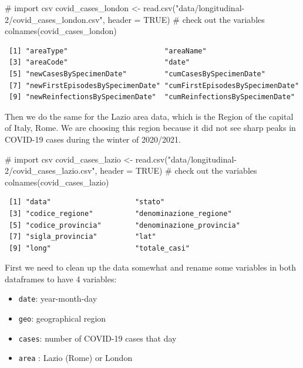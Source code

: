 \documentclass[
  letterpaper,
  DIV=11,
  numbers=noendperiod]{scrreprt}
\newenvironment{Shaded}{\begin{snugshade}}{\end{snugshade}}
\newcommand{\AttributeTok}[1]{\textcolor[rgb]{0.40,0.45,0.13}{#1}}
\newcommand{\CommentTok}[1]{\textcolor[rgb]{0.37,0.37,0.37}{#1}}
\newcommand{\ConstantTok}[1]{\textcolor[rgb]{0.56,0.35,0.01}{#1}}
\newcommand{\FunctionTok}[1]{\textcolor[rgb]{0.28,0.35,0.67}{#1}}
\newcommand{\NormalTok}[1]{\textcolor[rgb]{0.00,0.23,0.31}{#1}}
\newcommand{\OtherTok}[1]{\textcolor[rgb]{0.00,0.23,0.31}{#1}}
\newcommand{\StringTok}[1]{\textcolor[rgb]{0.13,0.47,0.30}{#1}}
\begin{document}
\begin{Shaded}
\begin{Highlighting}[]
\CommentTok{\# import csv }
\NormalTok{covid\_cases\_london }\OtherTok{\textless{}{-}} \FunctionTok{read.csv}\NormalTok{(}\StringTok{"data/longitudinal{-}2/covid\_cases\_london.csv"}\NormalTok{, }\AttributeTok{header =} \ConstantTok{TRUE}\NormalTok{)}
\CommentTok{\# check out the variables}
\FunctionTok{colnames}\NormalTok{(covid\_cases\_london)}
\end{Highlighting}
\end{Shaded}

\begin{verbatim}
 [1] "areaType"                       "areaName"                      
 [3] "areaCode"                       "date"                          
 [5] "newCasesBySpecimenDate"         "cumCasesBySpecimenDate"        
 [7] "newFirstEpisodesBySpecimenDate" "cumFirstEpisodesBySpecimenDate"
 [9] "newReinfectionsBySpecimenDate"  "cumReinfectionsBySpecimenDate" 
\end{verbatim}

Then we do the same for the Lazio area data, which is the Region of the
capital of Italy, Rome. We are choosing this region because it did not
see sharp peaks in COVID-19 cases during the winter of 2020/2021.

\begin{Shaded}
\begin{Highlighting}[]
\CommentTok{\# import csv }
\NormalTok{covid\_cases\_lazio }\OtherTok{\textless{}{-}} \FunctionTok{read.csv}\NormalTok{(}\StringTok{"data/longitudinal{-}2/covid\_cases\_lazio.csv"}\NormalTok{, }\AttributeTok{header =} \ConstantTok{TRUE}\NormalTok{)}
\CommentTok{\# check out the variables}
\FunctionTok{colnames}\NormalTok{(covid\_cases\_lazio)}
\end{Highlighting}
\end{Shaded}

\begin{verbatim}
 [1] "data"                    "stato"                  
 [3] "codice_regione"          "denominazione_regione"  
 [5] "codice_provincia"        "denominazione_provincia"
 [7] "sigla_provincia"         "lat"                    
 [9] "long"                    "totale_casi"            
\end{verbatim}

First we need to clean up the data somewhat and rename some variables in
both dataframes to have 4 variables:

\begin{itemize}
\item
  \texttt{date}: year-month-day
\item
  \texttt{geo}: geographical region
\item
  \texttt{cases}: number of COVID-19 cases that day
\item
  \texttt{area} : Lazio (Rome) or London
\end{itemize}
\end{document}
